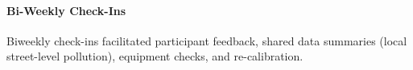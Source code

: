 \paragraph{Bi-Weekly Check-Ins}
Biweekly check-ins facilitated participant feedback, shared data summaries (local street-level pollution), equipment checks, and re-calibration.




